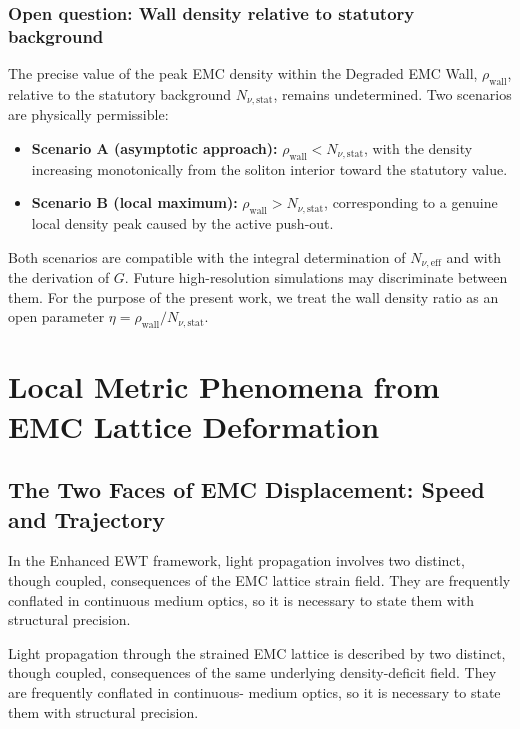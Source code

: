 \documentclass[10pt,a4paper]{article}
\begin{document}
\subsubsection{Open question: Wall density relative to statutory background}
\label{sec:wall_density_open}

The precise value of the peak EMC density within the Degraded EMC Wall, \(\rho_{\text{wall}}\), relative to the statutory background \(N_{\nu,\text{stat}}\), remains undetermined. Two scenarios are physically permissible:

\begin{itemize}
	\item \textbf{Scenario A (asymptotic approach):} \(\rho_{\text{wall}} < N_{\nu,\text{stat}}\), with the density increasing monotonically from the soliton interior toward the statutory value.
	\item \textbf{Scenario B (local maximum):} \(\rho_{\text{wall}} > N_{\nu,\text{stat}}\), corresponding to a genuine local density peak caused by the active push-out.
\end{itemize}

Both scenarios are compatible with the integral determination of \(N_{\nu,\text{eff}}\) and with the derivation of \(G\). Future high-resolution simulations may discriminate between them. For the purpose of the present work, we treat the wall density ratio as an open parameter \(\eta = \rho_{\text{wall}} / N_{\nu,\text{stat}}\).

\section{Local Metric Phenomena from EMC Lattice Deformation}
\label{sec:local_metric_emc}

\subsection{The Two Faces of EMC Displacement: Speed and Trajectory}
\label{sec:emc_displacement_two_faces}

In the Enhanced EWT framework, light propagation involves two
distinct, though coupled, consequences of the EMC lattice strain field.
They are frequently conflated in continuous medium optics, so it
is necessary to state them with structural precision.

Light propagation through the strained EMC lattice is described by
two distinct, though coupled, consequences of the same underlying
density-deficit field. They are frequently conflated in continuous-
medium optics, so it is necessary to state them with structural
precision.
\end{document}
